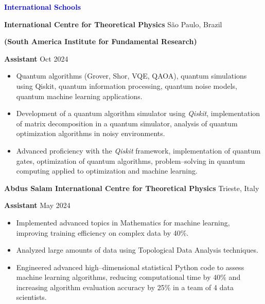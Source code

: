 \documentclass[10pt]{article}
\begin{document}
\vspace{12pt}
\begin{center}
    \textbf{\textcolor{blue}{International Schools}}
\end{center}
\vspace{12pt}

\textbf{International Centre for Theoretical Physics } \hfill São Paulo, Brazil 

\textbf{(South America Institute for Fundamental Research)}

\textbf{Assistant} \hfill Oct 2024
\begin{itemize}[noitemsep, topsep=0pt, partopsep=0pt, parsep=0pt]
    \item Quantum algorithms (Grover, Shor, VQE, QAOA), quantum simulations using Qiskit, quantum information processing, quantum noise models, quantum machine learning applications.
    \item Development of a quantum algorithm simulator using \textit{Qiskit}, implementation of matrix decomposition in a quantum simulator, analysis of quantum optimization algorithms in noisy environments.
    \item Advanced proficiency with the \textit{Qiskit} framework, implementation of quantum gates, optimization of quantum algorithms, problem–solving in quantum computing applied to optimization and machine learning.
\end{itemize}

\vspace{12pt}

\vspace{12pt}

\textbf{Abdus Salam International Centre for Theoretical Physics} \hfill Trieste, Italy

\textbf{Assistant} \hfill May 2024
\begin{itemize}[noitemsep, topsep=0pt, partopsep=0pt, parsep=0pt]
    \item Implemented advanced topics in Mathematics for machine learning, improving training efficiency on complex data by 40\%.
    \item Analyzed large amounts of data using Topological Data Analysis techniques.
    \item Engineered advanced high–dimensional statistical Python code to assess machine learning algorithms, reducing computational time by 40\% and increasing algorithm evaluation accuracy by 25\% in a team of 4 data scientists.
\end{itemize}
\end{document}
